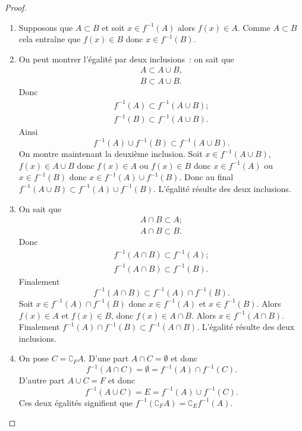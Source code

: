 \begin{proof}
  \begin{enumerate}
  \item Supposons que $A \subset B$ et soit $x \in f^{-1}(A)$ alors $f(x) \in A$. Comme $A\subset B$ cela entraîne que $f(x) \in B$ donc $x \in f^{-1}(B)$.
  \item On peut montrer l'égalité par deux inclusions~: on sait que
    \begin{gather}
      A \subset A \cup B, \\
      B \subset A \cup B.
    \end{gather}
    Donc
    \begin{gather} 
      f^{-1}(A) \subset f^{-1}(A \cup B); \\
      f^{-1}(B) \subset f^{-1}(A \cup B).
    \end{gather}
    Ainsi 
    \begin{equation}
      f^{-1}(A) \cup f^{-1}(B) \subset f^{-1}(A \cup B).
    \end{equation}
    On montre maintenant la deuxième inclusion. Soit $x \in f^{-1}(A \cup B)$, $f(x) \in A \cup B$ donc $f(x) \in A$ ou $f(x) \in B$ donc $x \in f^{-1}(A)$ ou $x \in f^{-1}(B)$ donc $x \in f^{-1}(A) \cup f^{-1}(B)$. Donc au final $f^{-1}(A \cup B) \subset f^{-1}(A) \cup f^{-1}(B)$. L'égalité résulte des deux inclusions.
  \item On sait que
    \begin{gather}
      A \cap B \subset A ; \\ A \cap B \subset B.
    \end{gather}
    Donc
    \begin{gather}
      f^{-1}(A \cap B) \subset f^{-1}(A); \\ f^{-1}(A \cap B) \subset f^{-1}(B).
    \end{gather}
    Finalement
    \begin{equation}
      f^{-1}(A \cap B) \subset f^{-1}(A) \cap f^{-1}(B).
    \end{equation}
    Soit $x \in f^{-1}(A) \cap f^{-1}(B)$ donc $x \in f^{-1}(A)$ et $x \in f^{-1}(B)$. Alors $f(x) \in A$ et $f(x) \in B$, donc $f(x) \in A \cap B$. Alors $x \in f^{-1}(A \cap B)$. Finalement $f^{-1}(A) \cap f^{-1}(B) \subset f^{-1}(A \cap B)$. L'égalité résulte des deux inclusions.
  \item On pose $C=\complement_F A$. D'une part $A \cap C =\emptyset$ et donc
    \begin{equation}
      f^{-1}(A \cap C)=\emptyset=f^{-1}(A) \cap f^{-1}(C).
    \end{equation}
D'autre part $A \cup C =F$ et donc
\begin{equation}
 f^{-1}(A \cup C) = E = f^{-1}(A) \cup f^{-1}(C).
\end{equation}
Ces deux égalités signifient que $f^{-1}(\complement_F A) = \complement_E f^{-1}(A)$.
  \end{enumerate}
\end{proof}
